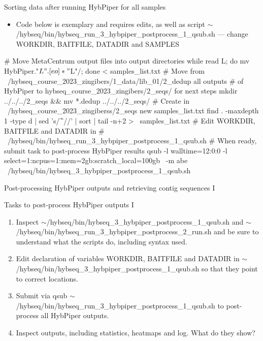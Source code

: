 \documentclass[compress,  xelatex, 11pt, xcolor=x11names, aspectratio=169,
	hyperref={
		bookmarks=true,
		unicode=true,
		colorlinks=true,
		pdftitle={HybSeq course},
		plainpages=false,
		pdfauthor={Vojtech Zeisek},
		pdfsubject={Practical processing of HybSeq target enrichment sequencing data on computing grids like MetaCentrum},
		pdfcreator={XeLaTeX},
		pdfkeywords={BASH, command line, GNU, HybSeq, Linux, MetaCentrum, sequencing shell, target enrichment},
		linkcolor=Turquoise4, %
		anchorcolor=DodgerBlue4, %
		citecolor=DodgerBlue4, %
		filecolor=DodgerBlue4, %
		menucolor=Tan4, %
		urlcolor=DarkOliveGreen4 %
		},
	url={hyphens, lowtilde} %
	]{beamer}
\renewcommand{\texttt}[1]{\colorbox{Cornsilk2}{{\ttfamily #1}}}
\renewcommand{\alert}[1]{\textcolor{OrangeRed3}{#1}}
\begin{document}
\begin{frame}[fragile]{Sorting data after running HybPiper for all samples}
	\begin{itemize}
		\item \alert{Code below is exemplary and requires edits, as well as script \texttt{$\sim$/hybseq/bin/hybseq\_run\_3\_hybpiper\_postprocess\_1\_qsub.sh} --- change \texttt{WORKDIR}, \texttt{BAITFILE}, \texttt{DATADIR} and \texttt{SAMPLES}}
	\end{itemize}
	\begin{bashcode}
    # Move MetaCentrum output files into output directories
    while read L; do mv HybPiper."$L".[eo]* "$L"/; done < samples_list.txt
    # Move from ~/hybseq_course_2023_zingibers/1_data/lib_01/2_dedup all outputs
    # of HybPiper to hybseq_course_2023_zingibers/2_seqs/ for next steps
    mkdir ../../../2_seqs && mv *.dedup ../../../2_seqs/
    # Create in ~/hybseq_course_2023_zingiberss/2_seqs new samples_list.txt
    find . -maxdepth 1 -type d | sed 's/^\.\///' | sort | tail -n+2 > \
      samples_list.txt
    # Edit WORKDIR, BAITFILE and DATADIR in
    # ~/hybseq/bin/hybseq_run_3_hybpiper_postprocess_1_qsub.sh
    # When ready, submit task to post-process HybPiper results
    qsub -l walltime=12:0:0 -l select=1:ncpus=1:mem=2gb:scratch_local=100gb \
       -m abe ~/hybseq/bin/hybseq_3_hybpiper_postprocess_1_qsub.sh
	\end{bashcode}
\end{frame}

\begin{frame}{Post-processing HybPiper outputs and retrieving contig sequences I}
	\begin{exampleblock}{Tasks to post-process HybPiper outputs I}
		\begin{enumerate}
			\item Inspect \texttt{$\sim$/hybseq/bin/hybseq\_3\_hybpiper\_postprocess\_1\_qsub.sh} and \texttt{$\sim$/hybseq/bin/hybseq\_run\_3\_hybpiper\_postprocess\_2\_run.sh} and be sure to understand what the scripts do, including syntax used.
			\item Edit declaration of variables \texttt{WORKDIR}, \texttt{BAITFILE} and \texttt{DATADIR} in \texttt{$\sim$/hybseq/bin/hybseq\_3\_hybpiper\_postprocess\_1\_qsub.sh} so that they point to correct locations.
			\item Submit via \texttt{qsub} \texttt{$\sim$/hybseq/bin/hybseq\_run\_3\_hybpiper\_postprocess\_1\_qsub.sh} to post-process all HybPiper outputs.
			\item Inspect outputs, including statistics, heatmaps and log. What do they show?
		\end{enumerate}
	\end{exampleblock}
\end{frame}
\end{document}

